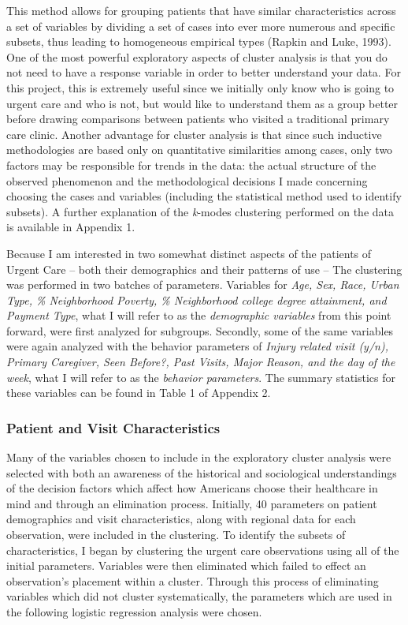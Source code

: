\documentclass[12pt,twoside]{reedthesis}
\begin{document}
  This method allows for grouping patients that have similar
  characteristics across a set of variables by dividing a set of cases
  into ever more numerous and specific subsets, thus leading to
  homogeneous empirical types (Rapkin and Luke, 1993). One of the most
  powerful exploratory aspects of cluster analysis is that you do not need
  to have a response variable in order to better understand your data. For
  this project, this is extremely useful since we initially only know who
  is going to urgent care and who is not, but would like to understand
  them as a group better before drawing comparisons between patients who
  visited a traditional primary care clinic. Another advantage for cluster
  analysis is that since such inductive methodologies are based only on
  quantitative similarities among cases, only two factors may be
  responsible for trends in the data: the actual structure of the observed
  phenomenon and the methodological decisions I made concerning choosing
  the cases and variables (including the statistical method used to
  identify subsets). A further explanation of the \emph{k}-modes
  clustering performed on the data is available in Appendix 1.
  
  Because I am interested in two somewhat distinct aspects of the patients
  of Urgent Care -- both their demographics and their patterns of use --
  The clustering was performed in two batches of parameters. Variables for
  \emph{Age, Sex, Race, Urban Type, \% Neighborhood Poverty, \%
  Neighborhood college degree attainment, and Payment Type}, what I will
  refer to as the \emph{demographic variables} from this point forward,
  were first analyzed for subgroups. Secondly, some of the same variables
  were again analyzed with the behavior parameters of \emph{Injury related
  visit (y/n), Primary Caregiver, Seen Before?, Past Visits, Major Reason,
  and the day of the week}, what I will refer to as the \emph{behavior
  parameters}. The summary statistics for these variables can be found in
  Table 1 of Appendix 2.
  
  \subsubsection*{Patient and Visit
  Characteristics}\label{patient-and-visit-characteristics}
  
  Many of the variables chosen to include in the exploratory cluster
  analysis were selected with both an awareness of the historical and
  sociological understandings of the decision factors which affect how
  Americans choose their healthcare in mind and through an elimination
  process. Initially, 40 parameters on patient demographics and visit
  characteristics, along with regional data for each observation, were
  included in the clustering. To identify the subsets of characteristics,
  I began by clustering the urgent care observations using all of the
  initial parameters. Variables were then eliminated which failed to
  effect an observation's placement within a cluster. Through this process
  of eliminating variables which did not cluster systematically, the
  parameters which are used in the following logistic regression analysis
  were chosen.
  
\end{document}
